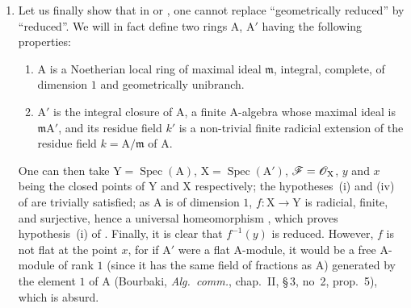 \begin{remarks}[15.2.4]
\begin{enumerate}[label=(\roman*)]
The only point $x$ of $\mathrm{X}$ above the point $y$ corresponding to the maximal ideal $(s)+(t)$ corresponds to the maximal ideal $(u)$; but since the class $\bar{u}$ of $u$ in $\sh{O}_x/\mathfrak{m}_y\sh{O}_x$ satisfies $\bar{u}^2=0$, $f^{-1}(y)$ is not a reduced $\mathbf{k}(y)$-prescheme.
Here $f$ is a finite, surjective and radicial morphism, hence a universal homeomorphism , but it is not flat at the point $x$, for if $\sh{O}_x$ were a flat $\sh{O}_y$-module, it would be an $\sh{O}_y$-module
free of rank $1$ generated by the element $1$ of $\sh{O}_x$ (Bourbaki, \emph{Alg.\ comm.}, chap.~II, \S\,3, no~2, prop.~5), which is absurd.
  \item Let us finally show that in  or , one cannot replace ``geometrically reduced'' by ``reduced''.
We will in fact define two rings $\mathrm{A}$, $\mathrm{A}'$ having the following properties:
\begin{enumerate}[label=\arabic*)]
  \item $\mathrm{A}$ is a Noetherian local ring of maximal ideal $\mathfrak{m}$, integral, complete, of dimension $1$ and geometrically unibranch.
  \item $\mathrm{A}'$ is the integral closure of $\mathrm{A}$, a finite $\mathrm{A}$-algebra whose maximal ideal is $\mathfrak{m}\mathrm{A}'$, and its residue field $k'$ is a non-trivial finite radicial extension of the residue field $k=\mathrm{A}/\mathfrak{m}$ of $\mathrm{A}$.
\end{enumerate}
One can then take $\mathrm{Y}=\operatorname{Spec}(\mathrm{A})$, $\mathrm{X}=\operatorname{Spec}(\mathrm{A}')$, $\mathscr{F}=\mathscr{O}_\mathrm{X}$, $y$ and $x$ being the closed points of $\mathrm{Y}$ and $\mathrm{X}$ respectively; the hypotheses~(i) and (iv) of  are trivially satisfied; as $\mathrm{A}$ is of dimension $1$, $f:\mathrm{X}\to\mathrm{Y}$ is radicial, finite, and surjective, hence a universal homeomorphism , which proves hypothesis~(i) of .
Finally, it is clear that $f^{-1}(y)$ is reduced.
However, $f$ is not flat at the point $x$, for if $\mathrm{A}'$ were a flat $\mathrm{A}$-module, it would be a free $\mathrm{A}$-module of rank $1$ (since it has the same field of fractions as $\mathrm{A}$) generated by the element $1$ of $\mathrm{A}$ (Bourbaki, \emph{Alg.\ comm.}, chap.~II, \S\,3, no~2, prop.~5), which is absurd.


\end{enumerate}
\end{remarks}
